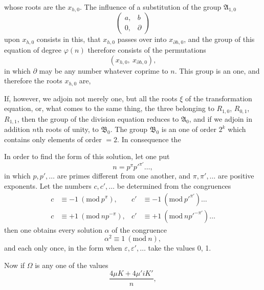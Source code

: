 
whose roots are the $x_{h,0}$. The influence of a substitution of the group
$\mathfrak{A}_{1,0}$
\[
\begin{pmatrix} a, & b \\ 0, & \partial \end{pmatrix}
\]
upon $x_{h,0}$ consists in this, that $x_{h,0}$ passes over into $x_{\partial h,0}$, and the
group of this equation of degree $\varphi(n)$ therefore consists of the permutations
\[
(x_{h,0},\ x_{\partial h,0}),
\]
in which $\partial$ may be any number whatever coprime to $n$. This group is
an  one, and therefore the roots $x_{h,0}$ are, 

If, however, we adjoin not merely one, but all the roots $\xi$ of the
transformation equation, or, what comes to the same thing, the three belonging to
$R_{1,0}$, $R_{0,1}$, $R_{1,1}$, then the group of the
division equation reduces to $\mathfrak{A}_0$, and if we adjoin in addition $n$th roots of unity,
to $\mathfrak{B}_0$. The group $\mathfrak{B}_0$ is an  one of
order $2^k$ which contains only elements of order $= 2$. In consequence the

In order to find the form of this solution, let one put
\[
n = p^\pi p'^{\pi'} \ldots,
\]
in which $p, p', \ldots$ are primes different from one another, and $\pi, \pi', \ldots$
are positive exponents. Let the numbers $c, c', \ldots$ be determined from the congruences
\[
\begin{aligned}
c &\equiv -1\ (\mathrm{mod}\ p^\pi), & c' &\equiv -1\ (\mathrm{mod}\ p'^{\pi'}) \ldots \\
c &\equiv +1\ (\mathrm{mod}\ np^{-\pi}), & c' &\equiv +1\ (\mathrm{mod}\ np'^{-\pi'}) \ldots
\end{aligned}
\]
then one obtains every solution $\alpha$ of the congruence
\[
\alpha^2 \equiv 1\ (\mathrm{mod}\ n),
\]
and each only once, in the form
when $\varepsilon, \varepsilon', \ldots$ take the values 0, 1.

Now if $\Omega$ is any one of the values
\[
\frac{4\mu K + 4\mu' i K'}{n},
\]
